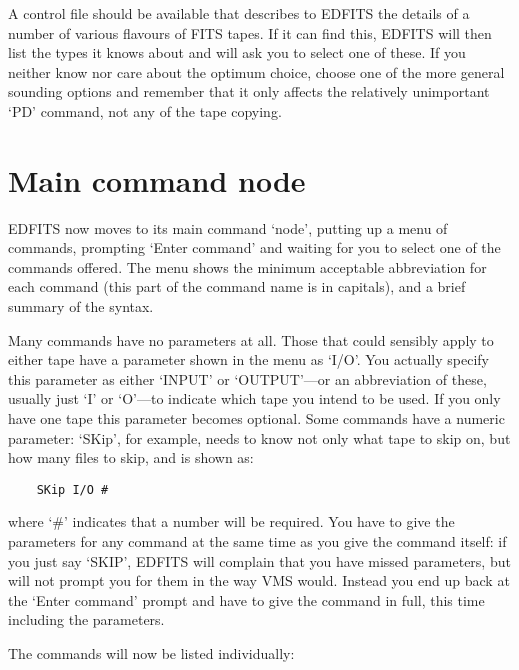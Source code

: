 A control file should be available that describes to EDFITS the details of
a number of various flavours of FITS tapes.  If it can find this, EDFITS
will then list the types it knows about and will ask you to select one of
these.  If you neither know nor care about the optimum choice, choose one of
the more general sounding options and remember that it only affects the
relatively unimportant `PD' command, not any of the tape copying.

\section{Main command node}

EDFITS now moves to its main command `node', putting up a menu of commands,
prompting `Enter command' and waiting for you to select one of the commands
offered.  The menu shows the minimum acceptable abbreviation for each command
(this part of the command name is in capitals), and a brief summary of the
syntax.

Many commands have no parameters at all.  Those that could sensibly
apply to either tape have a parameter shown in the menu as `I/O'.  You actually
specify this parameter as either `INPUT' or `OUTPUT'---or an abbreviation
of these, usually just `I' or `O'---to indicate which tape you intend to 
be used.  If you only have one tape this parameter becomes optional.  Some
commands have a numeric parameter: `SKip', for example, needs to know
not only what tape to skip on, but how many files to skip, and is shown
as:
\begin{verbatim}
    SKip I/O #
\end{verbatim}
where `\#' indicates that a number will be required.  You have to give
the parameters for any command at the same time as you give the command
itself: if you just say `SKIP', EDFITS will complain that you have missed
parameters, but will not prompt you for them in the way VMS would.  Instead
you end up back at the `Enter command' prompt and have to give the command
in full, this time including the parameters.

The commands will now be listed individually:

